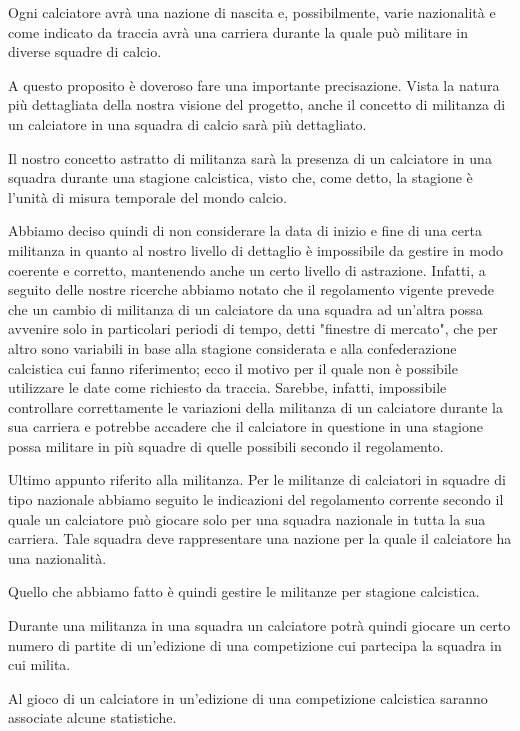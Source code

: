 \bigskip
\bigskip

Ogni calciatore avrà una nazione di nascita e, possibilmente, varie nazionalità e
come indicato da traccia avrà una carriera durante la quale può militare in diverse
squadre di calcio.

A questo proposito è doveroso fare una importante precisazione. Vista la natura più dettagliata
della nostra visione del progetto, anche il concetto di militanza di un calciatore in una squadra
di calcio sarà più dettagliato.

Il nostro concetto astratto di militanza sarà la presenza di un calciatore in una squadra
durante una stagione calcistica, visto che, come detto, la stagione è l'unità di misura
temporale del mondo calcio.

Abbiamo deciso quindi di non considerare la data di inizio e fine di una certa militanza in
quanto al nostro livello di dettaglio è impossibile da gestire in modo coerente e corretto,
mantenendo anche un certo livello di astrazione.
Infatti, a seguito delle nostre ricerche abbiamo notato che il regolamento vigente
prevede che un cambio di militanza di un calciatore da una squadra ad un'altra
possa avvenire solo in particolari periodi di tempo, detti "finestre di mercato",
che per altro sono variabili in base alla stagione considerata e alla confederazione
calcistica cui fanno riferimento; ecco il motivo per il quale non è possibile utilizzare
le date come richiesto da traccia.
Sarebbe, infatti, impossibile controllare correttamente le variazioni della militanza di un calciatore
durante la sua carriera e potrebbe accadere che il calciatore in questione in una stagione
possa militare in più squadre di quelle possibili secondo il regolamento.

Ultimo appunto riferito alla militanza. Per le militanze di calciatori in squadre di tipo
nazionale abbiamo seguito le indicazioni del regolamento corrente secondo il quale un calciatore
può giocare solo per una squadra nazionale in tutta la sua carriera. Tale squadra
deve rappresentare una nazione per la quale il calciatore ha una nazionalità.

Quello che abbiamo fatto è quindi gestire le militanze per stagione calcistica.

Durante una militanza in una squadra un calciatore potrà quindi giocare un certo numero di
partite di un'edizione di una competizione cui partecipa la squadra in cui milita.

Al gioco di un calciatore in un'edizione di una competizione calcistica saranno associate
alcune statistiche.


